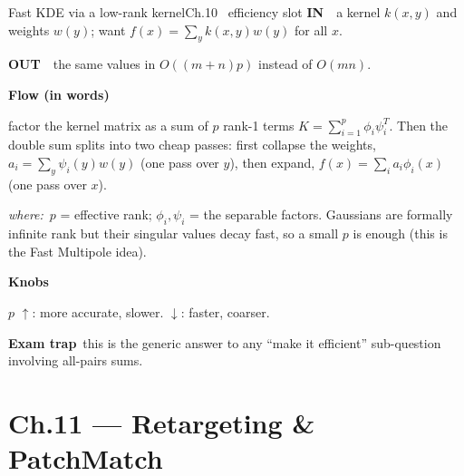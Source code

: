 \documentclass[9pt,a4paper]{extarticle}
\newcommand{\IN}{\textbf{\color{cIn}IN}\ }
\newcommand{\OUT}{\par\textbf{\color{cOut}OUT}\ }
\newcommand{\FLOW}{\par\smallskip\textbf{Flow (in words)}\par\nopagebreak}
\newcommand{\KNOBS}{\par\smallskip\textbf{Knobs}\par\nopagebreak}
\newcommand{\TRAP}{\par\smallskip\textbf{\color{cTrap}Exam trap}\ }
\newcommand{\WHERE}{\par\textit{where:}\ }
\newcommand{\up}{$\uparrow$}
\newcommand{\dn}{$\downarrow$}
\begin{document}
\begin{card}{Fast KDE via a low-rank kernel}{Ch.10 \textbullet\ efficiency slot}
\IN\ a kernel $k(x,y)$ and weights $w(y)$; want $f(x)=\sum_y k(x,y)w(y)$ for all $x$.
\OUT\ the same values in $O((m+n)p)$ instead of $O(mn)$.

\FLOW factor the kernel matrix as a sum of $p$ rank-1 terms $K=\sum_{i=1}^p\phi_i\psi_i^T$. Then the double sum splits into two cheap passes: first collapse the weights, $a_i=\sum_y\psi_i(y)w(y)$ (one pass over $y$), then expand, $f(x)=\sum_i a_i\phi_i(x)$ (one pass over $x$).
\WHERE $p$ = effective rank; $\phi_i,\psi_i$ = the separable factors. Gaussians are formally infinite rank but their singular values decay fast, so a small $p$ is enough (this is the Fast Multipole idea).
\KNOBS $p$ \up: more accurate, slower. \dn: faster, coarser.
\TRAP this is the generic answer to any ``make it efficient'' sub-question involving all-pairs sums.
\end{card}

\section{Ch.11 --- Retargeting \& PatchMatch}
\end{document}
